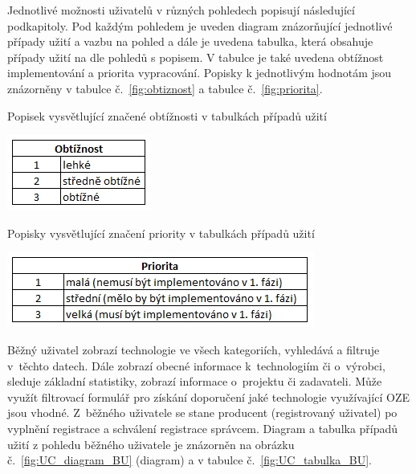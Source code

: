\documentclass[11pt,a4paper]{article}
\newcounter{subsubsubsection}
\begin{document}
Jednotlivé možnosti uživatelů v různých pohledech popisují následující podkapitoly. Pod každým pohledem je uveden diagram znázorňující jednotlivé případy užití a vazbu na pohled a dále je uvedena tabulka, která obsahuje případy užití na dle pohledů s popisem. V tabulce je také uvedena obtížnost implementování a priorita vypracování. Popisky k jednotlivým hodnotám jsou znázorněny v tabulce č.~\ref{fig:obtiznost} a tabulce č.~\ref{fig:priorita}.

\begin{table}[H] 
\centering 
\caption{Popisek vysvětlující značené obtížnosti v tabulkách případů užití} 
\includegraphics[scale=0.5]{vize_DTOZE_UC_0_obt} 
\label{fig:obtiznost}
\end{table} 

\begin{table}[H] 
\centering 
\caption{Popisky vysvětlující značení priority v tabulkách případů užití} 
\includegraphics[scale=0.5]{vize_DTOZE_UC_0_prior} 
\label{fig:priorita}
\end{table} 

Běžný uživatel zobrazí technologie ve všech kategoriích, vyhledává a filtruje v~těchto datech. Dále zobrazí obecné informace k~technologiím či o~výrobci, sleduje základní statistiky, zobrazí informace o~projektu či zadavateli. Může využít filtrovací formulář pro získání doporučení jaké technologie využívající OZE jsou vhodné. Z~běžného uživatele se stane producent (registrovaný uživatel) po vyplnění registrace a schválení registrace správcem. Diagram a tabulka případů užití z pohledu běžného uživatele je znázorněn na obrázku č.~\ref{fig:UC_diagram_BU} (diagram) a v tabulce č.~\ref{fig:UC_tabulka_BU}. 
\end{document}
